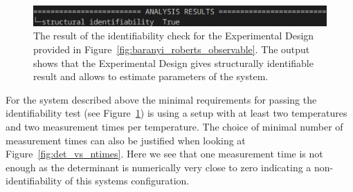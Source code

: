\documentclass[10pt,A4paper]{article}
\begin{document}
\begin{figure}[H]
    \centering
    \includegraphics[scale=0.5]{Figures/ident_check_output.pdf}
    \caption{{\footnotesize The result of the identifiability check for the Experimental Design provided in Figure~\ref{fig:baranyi_roberts_observable}.
    The output shows that the Experimental Design gives structurally identifiable result and allows to estimate parameters of the system.}}
    \label{fig:identif_check}
\end{figure}
For the system described above the minimal requirements for passing the identifiability test (see Figure~\ref{fig:identif_check}) is using a setup with at least two temperatures and two measurement times per temperature.
The choice of minimal number of measurement times can also be justified when looking at Figure~\ref{fig:det_vs_ntimes}.
Here we see that one measurement time is not enough as the determinant is numerically very close to zero indicating a non-identifiability of this systems configuration.
%
\end{document}

